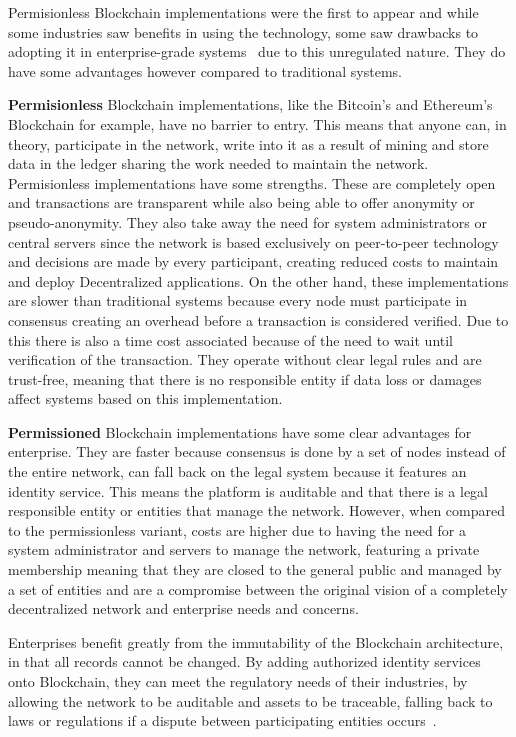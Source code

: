 Permisionless Blockchain implementations were the first to appear and while
some industries saw benefits in using the technology, some saw drawbacks to
adopting it in enterprise-grade systems~\cite{Gopinath2016} due to this
unregulated nature. They do have some advantages however compared to
traditional systems.

\textbf{Permisionless} Blockchain implementations, like the Bitcoin's and
Ethereum's Blockchain for example, have no barrier to entry. This means that
anyone can, in theory, participate in the network, write into it as a result of
mining and store data in the ledger sharing the work needed to maintain the
network.  Permisionless implementations have some strengths. These are
completely open and transactions are transparent while also being able to offer
anonymity or pseudo-anonymity. They also take away the need for system
administrators or central servers since the network is based exclusively on
peer-to-peer technology and decisions are made by every participant, creating
reduced costs to maintain and deploy Decentralized applications. On the other
hand, these implementations are slower than traditional systems because every
node must participate in consensus creating an overhead before a transaction is
considered verified. Due to this there is also a time cost associated because
of the need to wait until verification of the transaction. They operate without
clear legal rules and are trust-free, meaning that there is no responsible
entity if data loss or damages affect systems based on this implementation.

\textbf{Permissioned} Blockchain implementations have some clear advantages for
enterprise. They are faster because consensus is done by a set of nodes instead
of the entire network, can fall back on the legal system because it features an
identity service. This means the platform is auditable and that there is a
legal responsible entity or entities that manage the network. However, when
compared to the permissionless variant, costs are higher due to having the need
for a system administrator and servers to manage the network, featuring a
private membership meaning that they are closed to the general public and
managed by a set of entities and are a compromise between the original vision
of a completely decentralized network and enterprise needs and concerns. 

Enterprises benefit greatly from the immutability of the Blockchain
architecture, in that all records cannot be changed. By adding authorized
identity services onto Blockchain, they can meet the regulatory needs of their
industries, by allowing the network to be auditable and assets to be traceable,
falling back to laws or regulations if a dispute between participating entities
occurs~\cite{Barclay2017}.

